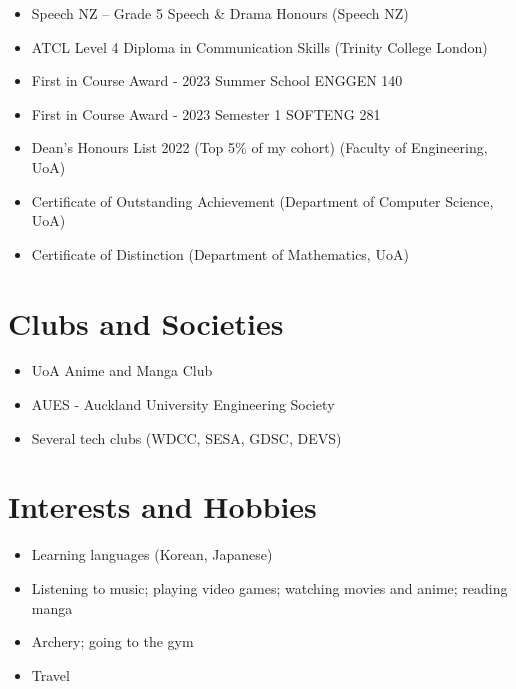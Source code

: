 \documentclass[a4paper,12pt]{article}
\newcommand{\sectionicon}[2]{%
    \section[#1]{\faIcon{#2}\quad #1}%
}
\begin{document}
\begin{itemize}[label=$\bullet$]
    \item Speech NZ – Grade 5 Speech \& Drama Honours (Speech NZ)
    \item ATCL Level 4 Diploma in Communication Skills (Trinity College London)
    \item First in Course Award - 2023 Summer School ENGGEN 140
    \item First in Course Award - 2023 Semester 1 SOFTENG 281
    \item Dean’s Honours List 2022 (Top 5\% of my cohort) (Faculty of Engineering, UoA)
    \item Certificate of Outstanding Achievement (Department of Computer Science, UoA)
    \item Certificate of Distinction (Department of Mathematics, UoA)
\end{itemize}

\sectionicon{Clubs and Societies}{users}

\begin{itemize}[label=$\bullet$]
    \item UoA Anime and Manga Club
    \item AUES - Auckland University Engineering Society
    \item Several tech clubs (WDCC, SESA, GDSC, DEVS)
\end{itemize}


\sectionicon{Interests and Hobbies}{heart}

\begin{itemize}[label=$\bullet$]
    \item Learning languages (Korean, Japanese)
    \item Listening to music; playing video games; watching movies and anime; reading manga
    \item Archery; going to the gym
    \item Travel
\end{itemize}


\end{document}
